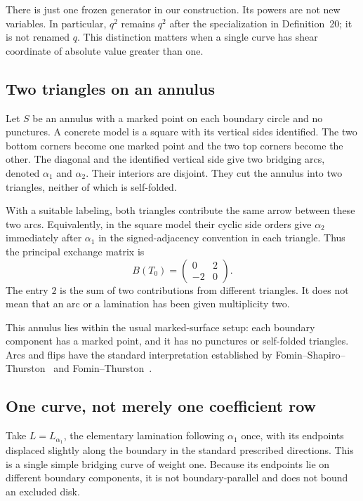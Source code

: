 \documentclass[11pt,letterpaper]{article}
\numberwithin{equation}{section}
\theoremstyle{definition}
\begin{document}
There is just one frozen generator in our construction. Its powers are not
new variables. In particular, $q^2$ remains $q^2$ after the specialization in
Definition~20; it is not renamed $q$. This distinction matters when a single
curve has shear coordinate of absolute value greater than one.

\subsection{Two triangles on an annulus}

Let $S$ be an annulus with a marked point on each boundary circle and no
punctures. A concrete model is a square with its vertical sides identified.
The two bottom corners become one marked point and the two top corners become
the other. The diagonal and the identified vertical side give two bridging
arcs, denoted $\alpha_1$ and $\alpha_2$. Their interiors are disjoint. They cut
the annulus into two triangles, neither of which is self-folded.

With a suitable labeling, both triangles contribute the same arrow between
these two arcs. Equivalently, in the square model their cyclic side orders give
$\alpha_2$ immediately after $\alpha_1$ in the signed-adjacency convention in
each triangle. Thus the principal exchange matrix is
\begin{equation}\label{eq:B0principal}
 B(T_0)=\begin{pmatrix}0&2\\-2&0\end{pmatrix}.
\end{equation}
The entry $2$ is the sum of two contributions from different triangles. It does
not mean that an arc or a lamination has been given multiplicity two.

This annulus lies within the usual marked-surface setup: each boundary
component has a marked point, and it has no punctures or self-folded triangles.
Arcs and flips have the standard interpretation established by
Fomin--Shapiro--Thurston~\cite{FST} and Fomin--Thurston~\cite{FT}.

\subsection{One curve, not merely one coefficient row}

Take $L=L_{\alpha_1}$, the elementary lamination following $\alpha_1$ once,
with its endpoints displaced slightly along the boundary in the standard
prescribed directions. This is a single simple bridging curve of weight one.
Because its endpoints lie on different boundary components, it is not
boundary-parallel and does not bound an excluded disk.
\end{document}
